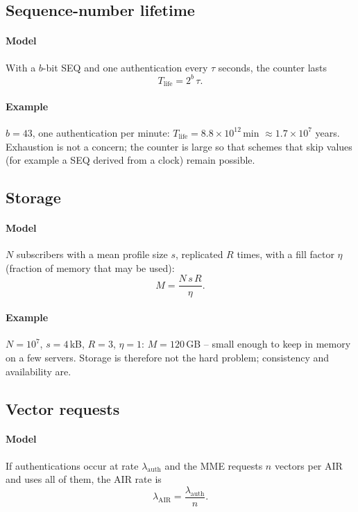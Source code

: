 \documentclass[11pt,a4paper]{article}
\begin{document}
\subsection{Sequence-number lifetime}\label{sec:sqn}
\paragraph{Model} With a $b$-bit SEQ and one authentication every $\tau$ seconds, the counter lasts
\begin{equation}\label{eq:sqnlife}
  T_{\mathrm{life}} = 2^{b}\,\tau .
\end{equation}
\paragraph{Example} $b = 43$, one authentication per minute: $T_{\mathrm{life}} = 8.8\times10^{12}$\,min
$\approx 1.7\times10^{7}$ years. Exhaustion is not a concern; the counter is large so that schemes that
skip values (for example a SEQ derived from a clock) remain possible.

\subsection{Storage}\label{sec:storage}
\paragraph{Model} $N$ subscribers with a mean profile size $s$, replicated $R$ times, with a fill factor
$\eta$ (fraction of memory that may be used):
\begin{equation}\label{eq:storage}
  M = \frac{N\,s\,R}{\eta}.
\end{equation}
\paragraph{Example} $N = 10^7$, $s = 4$\,kB, $R = 3$, $\eta = 1$: $M = 120$\,GB -- small enough to keep
in memory on a few servers. Storage is therefore not the hard problem; consistency and availability
are.

\subsection{Vector requests}\label{sec:air}
\paragraph{Model} If authentications occur at rate $\lambda_{\mathrm{auth}}$ and the MME requests $n$
vectors per AIR and uses all of them, the AIR rate is
\begin{equation}\label{eq:air}
  \lambda_{\mathrm{AIR}} = \frac{\lambda_{\mathrm{auth}}}{n}.
\end{equation}
\end{document}
